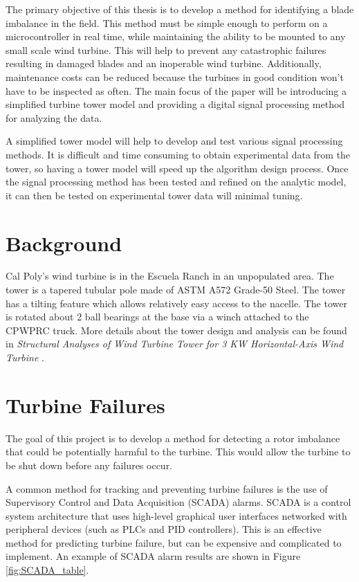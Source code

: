 The primary objective of this thesis is to develop a method for identifying a blade imbalance in the field.  This method must be simple enough to perform on a microcontroller in real time, while maintaining the ability to be mounted to any small scale wind turbine.   This will help to prevent any catastrophic failures resulting in damaged blades and an inoperable wind turbine.  Additionally, maintenance costs can be reduced because the turbines in good condition won't have to be inspected as often.  The main focus of the paper will be introducing a simplified turbine tower model and providing a digital signal processing method for analyzing the data.

A simplified tower model will help to develop and test various signal processing methods.  It is difficult and time consuming to obtain experimental data from the tower, so having a tower model will speed up the algorithm design process.  Once the signal processing method has been tested and refined on the analytic model, it can then be tested on experimental tower data will minimal tuning.

\section{Background}
Cal Poly’s wind turbine is in the Escuela Ranch in an unpopulated area.  The tower is a tapered tubular pole made of ASTM A572 Grade-50 Steel.  The tower has a tilting feature which allows relatively easy access to the nacelle.  The tower is rotated about 2 ball bearings at the base via a winch attached to the CPWPRC truck.  More details about the tower design and analysis can be found in \textit{Structural Analyses of Wind Turbine Tower for 3 KW Horizontal-Axis Wind Turbine} \cite{Gwon_paper}.

\section{Turbine Failures}
The goal of this project is to develop a method for detecting a rotor imbalance that could be potentially harmful to the turbine.  This would allow the turbine to be shut down before any failures occur.  

A common method for tracking and preventing turbine failures is the use of Supervisory Control and Data Acquisition (SCADA) alarms\cite{WT_failures_paper}.  SCADA is a control system architecture that uses high-level graphical user interfaces networked with peripheral devices (such as PLCs and PID controllers).  This is an effective method for predicting turbine failure, but can be expensive and complicated to implement.  An example of SCADA alarm results are shown in Figure \ref{fig:SCADA_table}.

